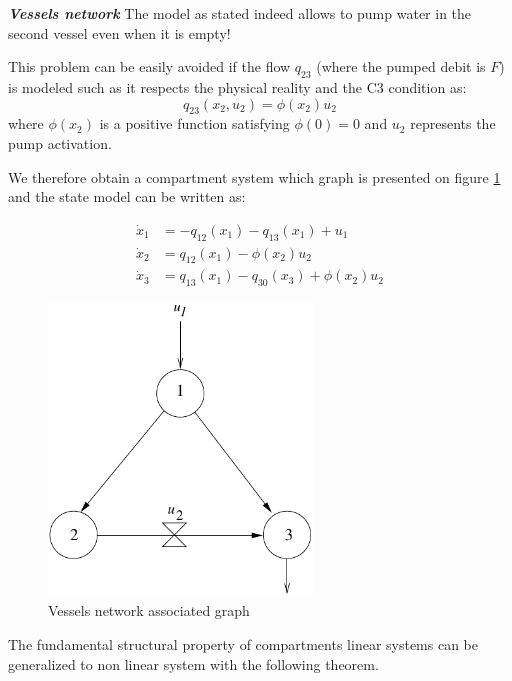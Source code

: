 \begin{exemple}{\bf \em Vessels network}
The model as stated indeed allows to pump water in the second vessel even when it is empty!

This problem can be easily avoided if the flow $q_{23}$ (where the pumped debit is $F$) is modeled such as it respects the physical reality and 
the C3 condition as:
$$q_{23}(x_2,u_2) = \phi(x_2)u_2$$
where $\phi(x_2)$ is a positive function satisfying $\phi(0) = 0$ and
$u_2$ represents the pump activation.

We therefore obtain a compartment system which graph is presented on figure \ref{Fig:graphreseau} and the state model can be written as:

\begin{equation*} \begin{split}
\dot x_1 &= - q_{12}(x_1) - q_{13}(x_1) + u_1 \\
\dot x_2 &=  q_{12}(x_1) - \phi(x_2)u_2 \\
\dot x_3 &= q_{13}(x_1) - q_{30}(x_3) + \phi(x_{2})u_2 
\end{split} \end{equation*}
\begin{figure}[h] 
\begin{center}
\includegraphics[width=7cm]{graphreseau}
\caption{Vessels network associated graph}
\label{Fig:graphreseau}
\end{center} 
\end{figure}
\cqfd
\end{exemple}
The fundamental structural property of compartments linear systems can be generalized to non linear system with the following theorem.

